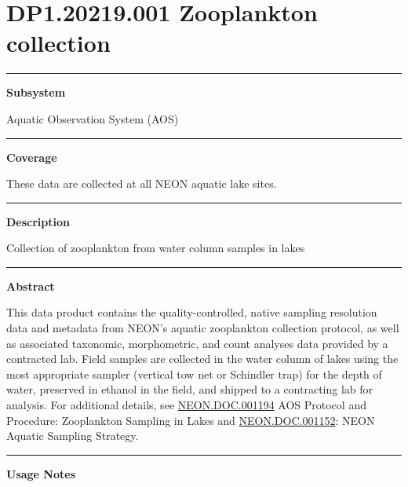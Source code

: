 \documentclass[]{article}
\begin{document}
\section{DP1.20219.001 Zooplankton
collection}\label{dp1.20219.001-zooplankton-collection}

\begin{center}\rule{0.5\linewidth}{\linethickness}\end{center}

\textbf{Subsystem}

Aquatic Observation System (AOS)

\begin{center}\rule{0.5\linewidth}{\linethickness}\end{center}

\textbf{Coverage}

These data are collected at all NEON aquatic lake sites.

\begin{center}\rule{0.5\linewidth}{\linethickness}\end{center}

\textbf{Description}

Collection of zooplankton from water column samples in lakes

\begin{center}\rule{0.5\linewidth}{\linethickness}\end{center}

\textbf{Abstract}

This data product contains the quality-controlled, native sampling
resolution data and metadata from NEON's aquatic zooplankton collection
protocol, as well as associated taxonomic, morphometric, and count
analyses data provided by a contracted lab. Field samples are collected
in the water column of lakes using the most appropriate sampler
(vertical tow net or Schindler trap) for the depth of water, preserved
in ethanol in the field, and shipped to a contracting lab for analysis.
For additional details, see
\href{http://data.neonscience.org/api/v0/documents/NEON.DOC.001194vF}{NEON.DOC.001194}
AOS Protocol and Procedure: Zooplankton Sampling in Lakes and
\href{http://data.neonscience.org/api/v0/documents/NEON.DOC.001152vA}{NEON.DOC.001152}:
NEON Aquatic Sampling Strategy.

\begin{center}\rule{0.5\linewidth}{\linethickness}\end{center}

\textbf{Usage Notes}
\end{document}
